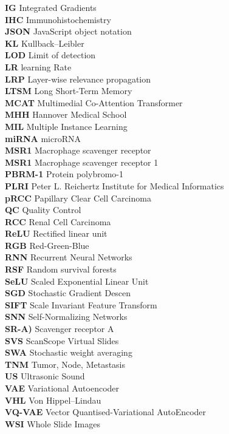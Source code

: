 \documentclass[12pt,a4paper,twoside,]{report}
\begin{document}
\begin{tabbing}
\textbf{IG} \> Integrated Gradients\\
\textbf{IHC} \> Immunohistochemistry\\
\textbf{JSON} \> JavaScript object notation\\
\textbf{KL} \> Kullback–Leibler\\
\textbf{LOD} \> Limit of detection\\
\textbf{LR} \> learning Rate\\
\textbf{LRP} \> Layer-wise relevance propagation\\
\textbf{LTSM} \> Long Short-Term Memory\\
\textbf{MCAT} \> Multimedial Co-Attention Transformer\\
\textbf{MHH} \> Hannover Medical School \\
\textbf{MIL} \> Multiple Instance Learning\\
\textbf{miRNA} \> microRNA \\
\textbf{MSR1} \> Macrophage scavenger receptor \\
\textbf{MSR1} \> Macrophage scavenger receptor 1\\
\textbf{PBRM-1} \> Protein polybromo-1\\
\textbf{PLRI} \> Peter L. Reichertz Institute for Medical Informatics\\
\textbf{pRCC} \> Papillary Clear Cell Carcinoma\\
\textbf{QC} \> Quality Control \\
\textbf{RCC} \> Renal Cell Carcinoma\\
\textbf{ReLU}\> Rectified linear unit\\
\textbf{RGB} \> Red-Green-Blue\\
\textbf{RNN} \> Recurrent Neural Networks\\
\textbf{RSF} \> Random survival forests\\
\textbf{SeLU} \> Scaled Exponential Linear Unit\\
\textbf{SGD} \>  Stochastic Gradient Descen\\
\textbf{SIFT} \> Scale Invariant Feature Transform\\
\textbf{SNN} \> Self-Normalizing Networks\\
\textbf{SR-A)} \> Scavenger receptor A\\
\textbf{SVS} \> ScanScope Virtual Slides\\
\textbf{SWA} \> Stochastic weight averaging\\
\textbf{TNM} \> Tumor, Node, Metastasis\\
\textbf{US} \> Ultrasonic Sound \\
\textbf{VAE} \> Variational Autoencoder\\
\textbf{VHL} \> Von Hippel–Lindau\\
\textbf{VQ-VAE} \> Vector Quantised-Variational AutoEncoder\\
\textbf{WSI} \> Whole Slide Images\\

\end{tabbing}
\end{document}
